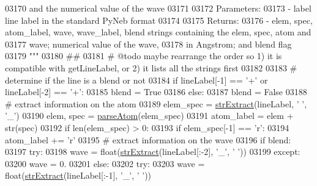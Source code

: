 \begin{DoxyCode}
{{{{{{{{{{{{{{{{{{{{{{03170 \textcolor{stringliteral}{    and the numerical value of the wave}
03171 \textcolor{stringliteral}{    }
03172 \textcolor{stringliteral}{    Parameters:}
03173 \textcolor{stringliteral}{        - label    line label in the standard PyNeb format}
03174 \textcolor{stringliteral}{    }
03175 \textcolor{stringliteral}{    Returns:}
03176 \textcolor{stringliteral}{        - elem, spec, atom\_label, wave, wave\_label, blend  strings containing the elem, spec, atom and }
03177 \textcolor{stringliteral}{                                                              wave; numerical value of the wave, }
03178 \textcolor{stringliteral}{                                                              in Angstrom; and blend flag }
03179 \textcolor{stringliteral}{    """}
03180     \textcolor{comment}{##}
03181     \textcolor{comment}{# @todo maybe rearrange the order so 1) it is compatible with getLineLabel, or 2) it lists all the
       strings first }
03182 
03183     \textcolor{comment}{# determine if the line is a blend or not}
03184     \textcolor{keywordflow}{if} lineLabel[-1] == \textcolor{stringliteral}{'+'}  \textcolor{keywordflow}{or} lineLabel[-2] == \textcolor{stringliteral}{'+'}:
03185         blend = \textcolor{keyword}{True}
03186     \textcolor{keywordflow}{else}:
03187         blend = \textcolor{keyword}{False}
03188     \textcolor{comment}{# extract information on the atom}
03189     elem\_spec = \hyperlink{namespacepyneb_1_1utils_1_1misc_aaf9c5249e3c3104e38854ca30f9df4b7}{strExtract}(lineLabel, \textcolor{stringliteral}{' '}, \textcolor{stringliteral}{'\_'})
03190     elem, spec = \hyperlink{namespacepyneb_1_1utils_1_1misc_a8c069186002a3e73dd474958e35034d5}{parseAtom}(elem\_spec)
03191     atom\_label = elem + str(spec)
03192     \textcolor{keywordflow}{if} len(elem\_spec) > 0:
03193         \textcolor{keywordflow}{if} elem\_spec[-1] == \textcolor{stringliteral}{'}\textcolor{stringliteral}{r':}
03194 \textcolor{stringliteral}{            atom\_label += }\textcolor{stringliteral}{'}\textcolor{stringliteral}{r'}
03195 \textcolor{stringliteral}{    }\textcolor{comment}{# extract information on the wave}
03196     \textcolor{keywordflow}{if} blend:
03197         \textcolor{keywordflow}{try}:
03198             wave = float(\hyperlink{namespacepyneb_1_1utils_1_1misc_aaf9c5249e3c3104e38854ca30f9df4b7}{strExtract}(lineLabel[:-2], \textcolor{stringliteral}{'\_'}, \textcolor{stringliteral}{' '}))
03199         \textcolor{keywordflow}{except}:
03200             wave = 0.
03201     \textcolor{keywordflow}{else}:
03202         \textcolor{keywordflow}{try}:
03203             wave = float(\hyperlink{namespacepyneb_1_1utils_1_1misc_aaf9c5249e3c3104e38854ca30f9df4b7}{strExtract}(lineLabel[:-1], \textcolor{stringliteral}{'\_'}, \textcolor{stringliteral}{' '}))
}}}}}}}}}}}}}}}}}}}}}}
\end{DoxyCode}
